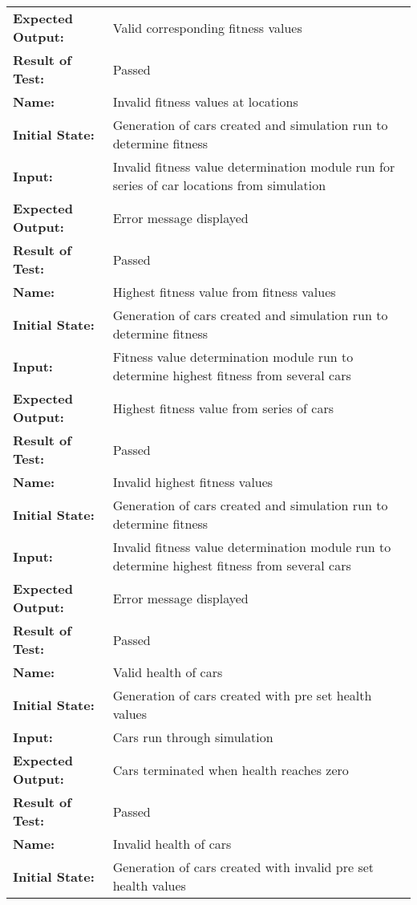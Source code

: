\documentclass[12pt, titlepage]{article}
\begin{document}
\begin{center}
\begin{longtable}{ l | p{10cm} }
\textbf{Expected Output:} & Valid corresponding fitness values\\[0.6em]
\textbf{Result of Test:} & Passed\\
\hline
\rule{0pt}{1.5em}\textbf{Name:} & Invalid fitness values at locations\\
\textbf{Initial State:} & Generation of cars created and simulation run to determine fitness\\
\textbf{Input:} & Invalid fitness value determination module run for series of car locations from simulation\\
\textbf{Expected Output:} & Error message displayed\\[0.6em]
\textbf{Result of Test:} & Passed\\
\hline
\rule{0pt}{1.5em}\textbf{Name:} & Highest fitness value from fitness values\\
\textbf{Initial State:} & Generation of cars created and simulation run to determine fitness\\
\textbf{Input:} & Fitness value determination module run to determine highest fitness from several cars\\
\textbf{Expected Output:} & Highest fitness value from series of cars\\[0.6em]
\textbf{Result of Test:} & Passed\\
\hline
\rule{0pt}{1.5em}\textbf{Name:} & Invalid highest fitness values\\
\textbf{Initial State:} & Generation of cars created and simulation run to determine fitness\\
\textbf{Input:} & Invalid fitness value determination module run to determine highest fitness from several cars\\
\textbf{Expected Output:} & Error message displayed\\[0.6em]
\textbf{Result of Test:} & Passed\\
\hline
\rule{0pt}{1.5em}\textbf{Name:} & Valid health of cars\\
\textbf{Initial State:} & Generation of cars created with pre set health values\\
\textbf{Input:} & Cars run through simulation\\
\textbf{Expected Output:} & Cars terminated when health reaches zero\\[0.6em]
\textbf{Result of Test:} & Passed\\
\hline
\rule{0pt}{1.5em}\textbf{Name:} & Invalid health of cars\\
\textbf{Initial State:} & Generation of cars created with invalid pre set health values\\

\end{longtable}
\end{center}
\end{document}
